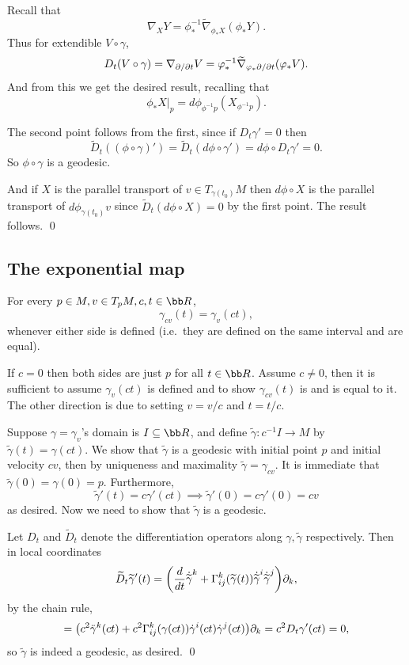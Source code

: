 \eprop

\bproof

    Recall that
    $$ \nabla_XY = \phi^{-1}_*\tilde\nabla_{\phi_*X}(\phi_*Y) . $$
    Thus for extendible $V\circ\gamma$,
    $$ D_t(V\circ\gamma) = \nabla_{\partial /\partial t}V = \varphi^{-1}_*\widetilde\nabla_{\varphi_*\partial /\partial t}(\varphi_*V) . $$
    And from this we get the desired result, recalling that
    $$ \phi_*X|_p = d\phi_{\phi^{-1}p}(X_{\phi^{-1}p}) . $$

    The second point follows from the first, since if $D_t\gamma'=0$ then
    $$ \tilde D_t((\phi\circ\gamma)') = \tilde D_t(d\phi\circ\gamma') = d\phi\circ D_t\gamma' = 0 . $$
    So $\phi\circ\gamma$ is a geodesic.

    And if $X$ is the parallel transport of $v\in T_{\gamma(t_0)}M$ then $d\phi\circ X$ is the parallel transport
    of $d\phi_{\gamma(t_0)}v$ since $\tilde D_t(d\phi\circ X)=0$ by the first point.
    The result follows.
    \qed

\eproof

\subsection{The exponential map}

\blemm[title=Rescaling lemma]

    For every $p\in M,v\in T_pM,c,t\in\bR$, 
    $$ \gamma_{cv}(t) = \gamma_v(ct) , $$
    whenever either side is defined (i.e.\ they are defined on the same interval and are equal).

\elemm

\bproof

    If $c=0$ then both sides are just $p$ for all $t\in\bR$.
    Assume $c\neq0$, then it is sufficient to assume $\gamma_v(ct)$ is defined and to show $\gamma_{cv}(t)$ is and is equal to it.
    The other direction is due to setting $v=v/c$ and $t=t/c$.

    Suppose $\gamma=\gamma_v$'s domain is $I\subseteq\bR$, and define $\tilde\gamma\colon c^{-1}I\to M$ by $\tilde\gamma(t)=\gamma(ct)$.
    We show that $\tilde\gamma$ is a geodesic with initial point $p$ and initial velocity $cv$, then by uniqueness and maximality
    $\tilde\gamma=\gamma_{cv}$.
    It is immediate that $\tilde\gamma(0)=\gamma(0)=p$.
    Furthermore,
    $$ \tilde\gamma'(t) = c\gamma'(ct) \implies \tilde\gamma'(0) = c\gamma'(0) = cv $$
    as desired.
    Now we need to show that $\tilde\gamma$ is a geodesic.

    Let $D_t$ and $\tilde D_t$ denote the differentiation operators along $\gamma,\tilde\gamma$ respectively.
    Then in local coordinates
    $$ \widetilde D_t\widetilde\gamma'(t) = \mathopen{}\mathclose{\left({{d}\over{dt}}\dot{\widetilde{\gamma}}^k + \Gamma^k_{ij}(\widetilde\gamma(t))\dot{\widetilde{\gamma}}^i\dot{\widetilde{\gamma}}^j\right)}\partial_k , $$
    by the chain rule,
    $$ = \mathopen{}\mathclose{\left(c^2\ddot\gamma^k(ct) + c^2\Gamma^k_{ij}(\gamma(ct))\dot\gamma^i(ct)\dot\gamma^j(ct)\right)}\partial_k = c^2D_t\gamma'(ct) = 0 , $$
    so $\tilde\gamma$ is indeed a geodesic, as desired.
    \qed

